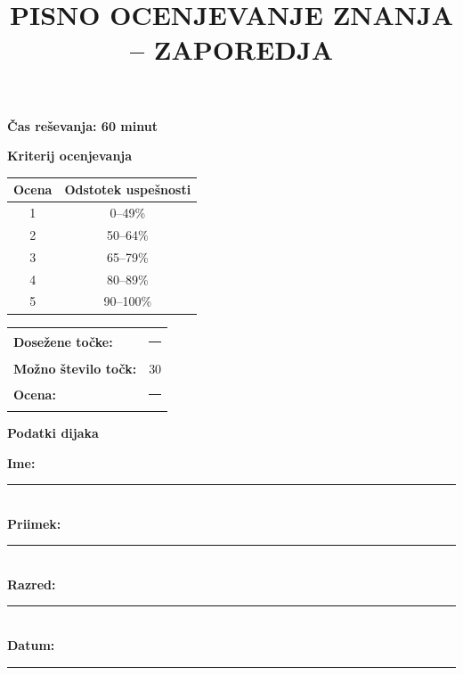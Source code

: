\documentclass[a4paper,12pt]{article}
\title{PISNO OCENJEVANJE ZNANJA -- ZAPOREDJA}
\author{}
\date{}
\begin{document}
\maketitle

\begin{center}
	\large\textbf{Čas reševanja: 60 minut}
\end{center}

\vspace{0.5cm}

\noindent
\begin{minipage}[t]{0.54\textwidth}
	\textbf{Kriterij ocenjevanja}

	\medskip

	\begin{tabular}{|c|c|}
		\hline
		Ocena & Odstotek uspešnosti \\
		\hline
		1 & 0--49\% \\
		\hline
		2 & 50--64\% \\
		\hline
		3 & 65--79\% \\
		\hline
		4 & 80--89\% \\
		\hline
		5 & 90--100\% \\
		\hline
	\end{tabular}

	\medskip

	\begin{tabular}{ll}
		\textbf{Dosežene točke:} & \rule{1.5cm}{0.4pt} \\
		\textbf{Možno število točk:} & 30 \\
		\textbf{Ocena:} & \rule{1.5cm}{0.4pt}
	\end{tabular}
\end{minipage}
\hfill
\begin{minipage}[t]{0.38\textwidth}
	\textbf{Podatki dijaka}

	\vspace{0.4cm}

	\textbf{Ime:}\\[0.2cm]
	\rule{\linewidth}{0.4pt}\\[0.7cm]
	\textbf{Priimek:}\\[0.2cm]
	\rule{\linewidth}{0.4pt}\\[0.7cm]
	\textbf{Razred:}\\[0.2cm]
	\rule{\linewidth}{0.4pt}\\[0.7cm]
	\textbf{Datum:}\\[0.2cm]
	\rule{\linewidth}{0.4pt}
\end{minipage}

\vspace{0.5cm}
\end{document}
